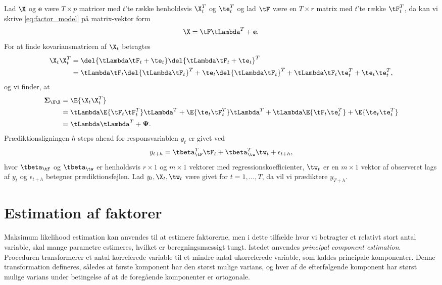 Lad \(\X\) og \(\mathbf{e}\) være \(T \times p\) matricer med \(t\)'te række henholdsvis \(\X_t^T\) og \(\te_t^T\) og lad \(\tF\) være en \(T \times r\) matrix med \(t\)'te række \(\tF_t^T\), da kan vi skrive \eqref{eq:factor_model} på matrix-vektor form
\begin{align*}
\X = \tF \tLambda^T + \mathbf{e}.
\end{align*}
For at finde kovariansmatricen af \(\X_t\) betragtes
\begin{align*}
\X_t \X_t^T &= \del{ \tLambda \tF_t + \te_t} \del{ \tLambda \tF_t + \te_t}^T \\
&= \tLambda \tF_t \del{\tLambda \tF_t }^T + \te_t \del{\tLambda \tF_t}^T + \tLambda \tF_t \te_t^T + \te_t \te_t^T,
\end{align*}
og vi finder, at
\begin{align*}
\boldsymbol{\Sigma}_{\X \X} &=  \E{\X_t \X_t^T} \\
&= \tLambda \E{\tF_t \tF_t^T} \tLambda^T + \E{\te_t \tF_t^T} \tLambda^T + \tLambda \E{\tF_t \te_t^T} + \E{\te_t \te_t^T} \\
&= \tLambda \tLambda^T + \boldsymbol{\Psi}.
\end{align*}
Prædiktionsligningen \(h\)-steps ahead for responsvariablen \(y_t\) er givet ved
\begin{align}
y_{t+h} = \tbeta_{\tF}^T \tF_t + \tbeta_{\tw}^T \tw_t + \epsilon_{t+h}, \label{eq:factor_model_forecast}
\end{align}
hvor \(\tbeta_{\tF}\) og \(\tbeta_{\tw}\) er henholdsvis \(r \times 1\) og \(m \times 1\) vektorer med regressionskoefficienter, \(\tw_t\) er en \(m \times 1\) vektor af observeret lags af \(y_t\) og \(\epsilon_{t+h}\) betegner prædiktionsfejlen.
Lad \(y_t, \X_t, \tw_t\) være givet for \(t = 1, \ldots, T\), da vil vi prædiktere \(y_{T+h}\).

\section{Estimation af faktorer}
Maksimum likelihood estimation kan anvendes til at estimere faktorerne, men i dette tilfælde hvor vi betragter et relativt stort antal variable, skal mange parametre estimeres, hvilket er beregningsmæssigt tungt.
Istedet anvendes \textit{principal component estimation}.
Proceduren transformerer et antal korrelerede variable til et mindre antal ukorrelerede variable, som kaldes principale komponenter.
Denne transformation defineres, således at første komponent har den størst mulige varians, og hver af de efterfølgende komponent har størst mulige varians under betingelse af at de foregående komponenter er ortogonale.

